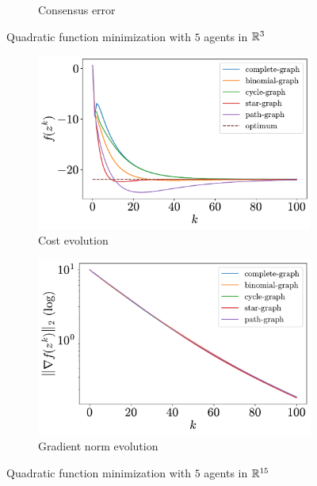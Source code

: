 \documentclass[a4paper,11pt,oneside]{book}
\begin{document}
\begin{figure}[htb!]
\begin{subfigure}[t]{0.46\linewidth}
            \caption{Consensus error}
      \end{subfigure}
      \caption{Quadratic function minimization with $5$ agents in ${\mathbb{R}}^{3}$}
      \label{fig:quadratic_5_3}
\end{figure}

\begin{figure}[htb!]
      \centering
      \begin{subfigure}[t]{0.46\linewidth}
            \centering
            \includegraphics[width=\linewidth]{./figs/quadratic/5_15_100/cost.pdf} 
            \caption{Cost evolution}
      \end{subfigure}
      \hfill
      \begin{subfigure}[t]{0.46\linewidth}
            \centering
            \includegraphics[width=\linewidth]{./figs/quadratic/5_15_100/gradient.pdf} 
            \caption{Gradient norm evolution}
      \end{subfigure}
      \caption{Quadratic function minimization with $5$ agents in ${\mathbb{R}}^{15}$}
      \label{fig:quadratic_5_15}
\end{figure}
\end{document}

